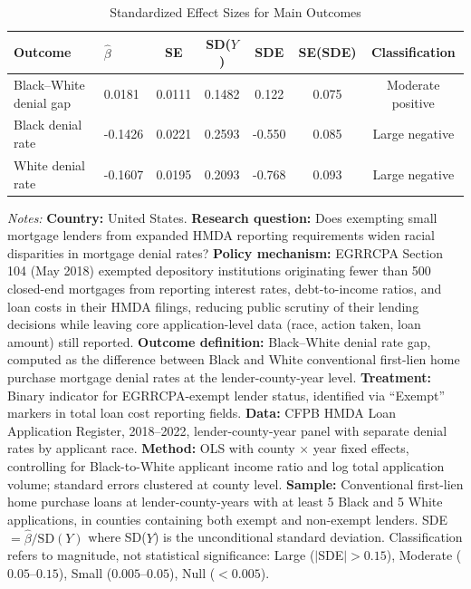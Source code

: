 \begin{table}[H]
\centering
\caption{Standardized Effect Sizes for Main Outcomes}
\label{tab:sde}
\begin{threeparttable}
\small
\begin{tabular}{llccccc}
\toprule
Outcome & $\hat{\beta}$ & SE & SD($Y$) & SDE & SE(SDE) & Classification \\
\midrule
Black--White denial gap & 0.0181 & 0.0111 & 0.1482 & 0.122 & 0.075 & Moderate positive \\
Black denial rate & -0.1426 & 0.0221 & 0.2593 & -0.550 & 0.085 & Large negative \\
White denial rate & -0.1607 & 0.0195 & 0.2093 & -0.768 & 0.093 & Large negative \\
\bottomrule
\end{tabular}
\begin{tablenotes}[flushleft]\small
\item \textit{Notes:} \textbf{Country:} United States. \textbf{Research question:} Does exempting small mortgage lenders from expanded HMDA reporting requirements widen racial disparities in mortgage denial rates? \textbf{Policy mechanism:} EGRRCPA Section 104 (May 2018) exempted depository institutions originating fewer than 500 closed-end mortgages from reporting interest rates, debt-to-income ratios, and loan costs in their HMDA filings, reducing public scrutiny of their lending decisions while leaving core application-level data (race, action taken, loan amount) still reported. \textbf{Outcome definition:} Black--White denial rate gap, computed as the difference between Black and White conventional first-lien home purchase mortgage denial rates at the lender-county-year level. \textbf{Treatment:} Binary indicator for EGRRCPA-exempt lender status, identified via ``Exempt'' markers in total loan cost reporting fields. \textbf{Data:} CFPB HMDA Loan Application Register, 2018--2022, lender-county-year panel with separate denial rates by applicant race. \textbf{Method:} OLS with county $\times$ year fixed effects, controlling for Black-to-White applicant income ratio and log total application volume; standard errors clustered at county level. \textbf{Sample:} Conventional first-lien home purchase loans at lender-county-years with at least 5 Black and 5 White applications, in counties containing both exempt and non-exempt lenders. SDE $= \hat{\beta} / \text{SD}(Y)$ where SD($Y$) is the unconditional standard deviation. Classification refers to magnitude, not statistical significance: Large ($|$SDE$| > 0.15$), Moderate ($0.05$--$0.15$), Small ($0.005$--$0.05$), Null ($< 0.005$).
\end{tablenotes}
\end{threeparttable}
\end{table}
